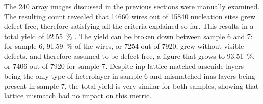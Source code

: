The \num{240} array images discussed in the previous sections were manually examined. The resulting count revealed that \num{14660} wires out of \num{15840} nucleation sites grew defect-free, therefore satisfying all the criteria explained so far. This results in a total yield of \qty{92.55}{\percent} \cite{Brugnolotto2023_2}. The yield can be broken down between sample 6 and 7: for sample 6, \qty{91.59}{\percent} of the wires, or \num{7254} out of \num{7920}, grew without visible defects, and therefore assumed to be defect-free, a figure that grows to \qty{93.51}{\percent}, or \num{7406} out of \num{7920} for sample 7. Despite \acs{inp}-lattice-matched arsenide layers being the only type of heterolayer in sample 6 and mismatched \acf{inas} layers being present in sample 7, the total yield is very similar for both samples, showing that lattice mismatch had no impact on this metric.

